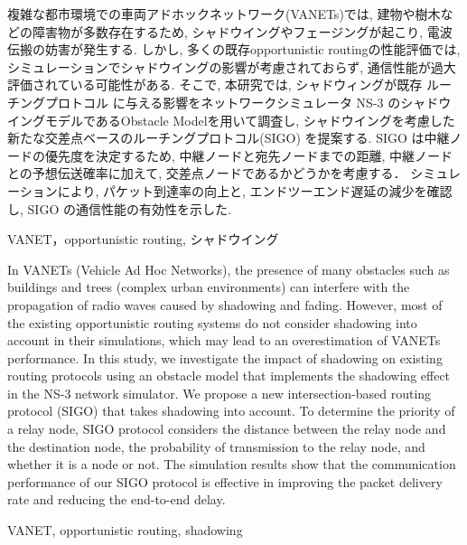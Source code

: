 \documentclass[technicalreport]{ieicej}
\begin{document}
\begin{jabstract}
 複雑な都市環境での車両アドホックネットワーク(VANETs)では, 建物や樹木などの障害物が多数存在するため, シャドウイングやフェージングが起こり, 電波伝搬の妨害が発生する. しかし, 多くの既存opportunistic routingの性能評価では, シミュレーションでシャドウイングの影響が考慮されておらず, 通信性能が過大評価されている可能性がある. そこで, 本研究では, シャドウィングが既存 ルーチングプロトコル に与える影響をネットワークシミュレータ NS-3 のシャドウイングモデルであるObstacle Modelを用いて調査し, シャドウイングを考慮した新たな交差点ベースのルーチングプロトコル(SIGO) を提案する. SIGO は中継ノードの優先度を決定するため, 中継ノードと宛先ノードまでの距離, 中継ノードとの予想伝送確率に加えて, 交差点ノードであるかどうかを考慮する． シミュレーションにより, パケット到達率の向上と, エンドツーエンド遅延の減少を確認し, SIGO の通信性能の有効性を示した.
\end{jabstract}
\begin{jkeyword}
VANET，opportunistic routing, シャドウイング
\end{jkeyword}
\begin{eabstract}
In VANETs (Vehicle Ad Hoc Networks), the presence of many obstacles such as buildings and trees (complex urban environments) can interfere with the propagation of radio waves caused by shadowing and fading. However, most of the existing opportunistic routing systems do not consider shadowing into account in their simulations, which may lead to an overestimation of VANETs performance. In this study, we investigate the impact of shadowing on existing routing protocols using an obstacle model that implements the shadowing effect in the NS-3 network simulator. We propose a new intersection-based routing protocol (SIGO) that takes shadowing into account. To determine the priority of a relay node, SIGO protocol considers the distance between the relay node and the destination node, the probability of transmission to the relay node, and whether it is a node or not. The simulation results show that the communication performance of our SIGO protocol is effective in improving the packet delivery rate and reducing the end-to-end delay.
\end{eabstract}
\begin{ekeyword}
VANET, opportunistic routing, shadowing
\end{ekeyword}
\maketitle
\end{document}
